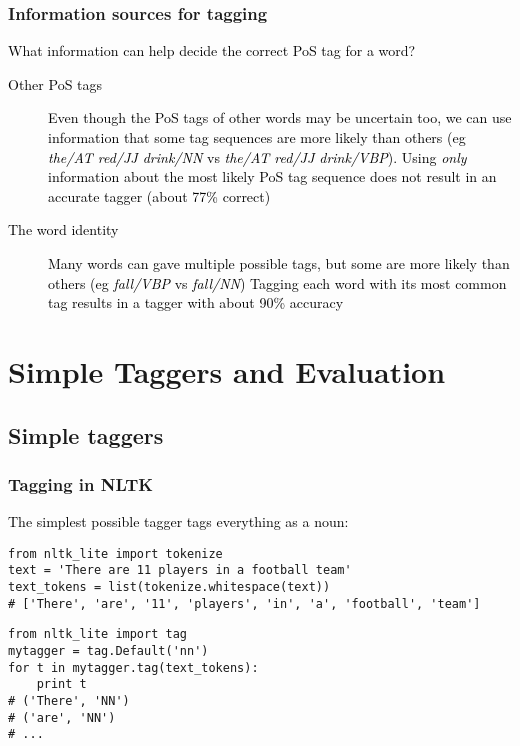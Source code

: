 \documentclass{beamer}             %
\begin{document}

\begin{frame}
  \frametitle{Information sources for tagging}
  \textcolor{black}{
  What information can help decide the correct PoS tag for a word?
  \begin{description}
  \item[Other PoS tags] Even though the PoS tags of other words may be
    uncertain too, we can use information that some tag sequences are
    more likely than others (eg \emph{the/AT red/JJ drink/NN} vs \emph{the/AT
      red/JJ drink/VBP}).\newline
    Using \emph{only} information about the most likely PoS tag
    sequence does not result in an accurate tagger (about 77\%
    correct)
  \item[The word identity] Many words can gave multiple possible tags,
    but some are more likely than others (eg \emph{fall/VBP} vs
    \emph{fall/NN}) \newline
    Tagging each word with its most common tag results in a tagger
    with about 90\% accuracy
  \end{description}}
\end{frame}



\section{Simple Taggers and Evaluation}

\subsection{Simple taggers} 

\begin{frame}[fragile]
  \frametitle{Tagging in NLTK}
\textcolor{black}{The simplest possible tagger tags everything as a noun:}
\small
\begin{verbatim}
from nltk_lite import tokenize
text = 'There are 11 players in a football team'
text_tokens = list(tokenize.whitespace(text))
# ['There', 'are', '11', 'players', 'in', 'a', 'football', 'team']
\end{verbatim}
  \pause
\begin{verbatim}
from nltk_lite import tag
mytagger = tag.Default('nn')
for t in mytagger.tag(text_tokens):
    print t
# ('There', 'NN')
# ('are', 'NN')
# ...
\end{verbatim}
\end{frame}
\end{document}
